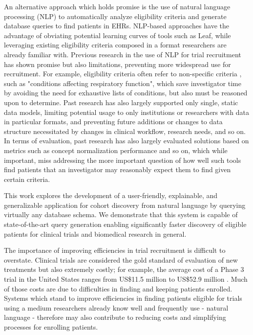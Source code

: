 \documentclass[../main.tex]{subfiles}
\begin{document}
An alternative approach which holds promise is the use of natural language processing (NLP) to automatically analyze eligibility criteria and generate database queries to find patients in EHRs. NLP-based approaches have the advantage of obviating potential learning curves of tools such as Leaf, while leveraging existing eligibility criteria composed in a format researchers are already familiar with. Previous research in the use of NLP for trial recruitment \cite{yuan2019criteria2query, soni2020patient, fang2022combining, zhang2020deepenroll, chen2019clinical, patrao2015recruit, dhayne2021emr2vec, liu2021evaluating, xiong2019cohort} has shown promise but also limitations, preventing more widespread use for recruitment. For example, eligibility criteria often refer to non-specific criteria \cite{wang2017classifying, ross2010analysis}, such as "conditions affecting respiratory function", which save investigator time by avoiding the need for exhaustive lists of conditions, but also must be reasoned upon to determine. Past research has also largely supported only single, static data models, limiting potential usage to only institutions or researchers with data in particular formats, and preventing future additions or changes to data structure necessitated by changes in clinical workflow, research needs, and so on. In terms of evaluation, past research has also largely evaluated solutions based on metrics such as concept normalization performance and so on, which while important, miss addressing the more important question of how well such tools find patients that an investigator may reasonably expect them to find given certain criteria.

This work explores the development of a user-friendly, explainable, and generalizable application for cohort discovery from natural language by querying virtually any database schema. We demonstrate that this system is capable of state-of-the-art query generation enabling significantly faster discovery of eligible patients for clinical trials and biomedical research in general.

The importance of improving efficiencies in trial recruitment is difficult to overstate. Clinical trials are considered the gold standard of evaluation of new treatments but also extremely costly; for example, the average cost of a Phase 3 trial in the United States ranges from US\$11.5 million to US\$52.9 million \cite{sertkaya2016key}. Much of those costs are due to difficulties in finding and keeping patients enrolled. Systems which stand to improve efficiencies in finding patients eligible for trials using a medium researchers already know well and frequently use - natural language - therefore may also contribute to reducing costs and simplifying processes for enrolling patients. 
\end{document}
